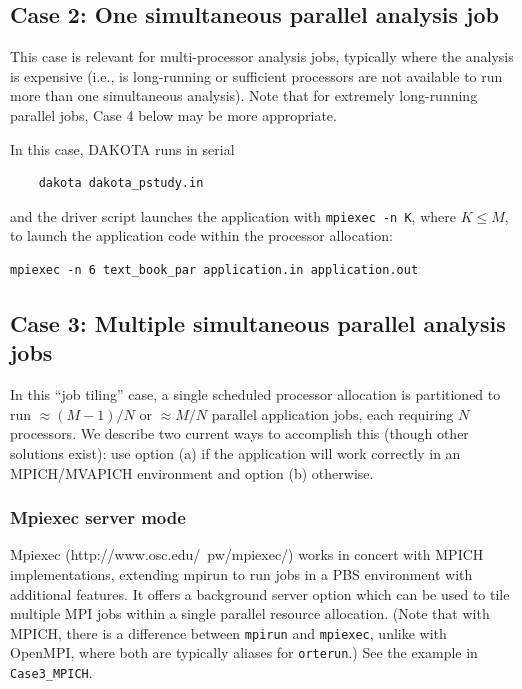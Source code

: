 \subsection{Case 2: One simultaneous parallel analysis job}

This case is relevant for multi-processor analysis jobs, typically
where the analysis is expensive (i.e., is long-running or sufficient
processors are not available to run more than one simultaneous
analysis).  Note that for extremely long-running parallel jobs, Case 4
below may be more appropriate.

In this case, DAKOTA runs in serial
\begin{verbatim}
    dakota dakota_pstudy.in
\end{verbatim}
and the driver script launches the application with {\tt mpiexec -n
K}, where $K \leq M$, to launch the application code within the
processor allocation:
\begin{verbatim}
mpiexec -n 6 text_book_par application.in application.out
\end{verbatim}

\subsection{Case 3: Multiple simultaneous parallel analysis jobs}

In this ``job tiling'' case, a single scheduled processor allocation
is partitioned to run $\approx (M-1)/N$ or $\approx M/N$ parallel
application jobs, each requiring $N$ processors.  We describe two
current ways to accomplish this (though other solutions exist): use
option (a) if the application will work correctly in an MPICH/MVAPICH
environment and option (b) otherwise.

\subsubsection{Mpiexec server mode}

Mpiexec (http://www.osc.edu/~pw/mpiexec/) works in concert with MPICH
implementations, extending mpirun to run jobs in a PBS environment
with additional features.  It offers a background server option which
can be used to tile multiple MPI jobs within a single parallel
resource allocation.  (Note that with MPICH, there is a difference
between {\tt mpirun} and {\tt mpiexec}, unlike with OpenMPI, where
both are typically aliases for {\tt orterun}.)  See the example in
\texttt{Case3\_MPICH}.

